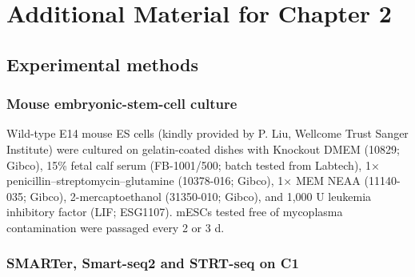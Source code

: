 \chapter{Additional Material for Chapter 2} 

\graphicspath{{Appendix1/Figs/}}

\section{Experimental methods} \label{sec:power-analysis-methods}

\subsection{Mouse embryonic-stem-cell culture}

\begin{sloppypar}
Wild-type E14 mouse ES cells (kindly provided by P. Liu, Wellcome Trust Sanger Institute) were cultured on gelatin-coated dishes with Knockout DMEM (10829; Gibco), 15\% fetal calf serum (FB-1001/500; batch tested from Labtech), 1× penicillin–streptomycin–glutamine (10378-016; Gibco), 1× MEM NEAA (11140-035; Gibco), 2-mercaptoethanol (31350-010; Gibco), and 1,000 U leukemia inhibitory factor (LIF; ESG1107). mESCs tested free of mycoplasma contamination were passaged every 2 or 3 d.
\end{sloppypar}

\subsection{SMARTer, Smart-seq2 and STRT-seq on C1}

